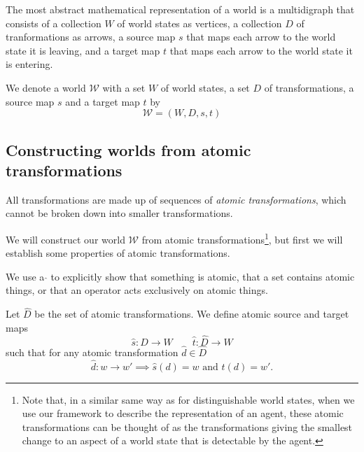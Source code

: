 \begin{postulate}
	The most abstract mathematical representation of a world is a multidigraph that consists of a collection $W$ of world states as vertices, a collection $D$ of tranformations as arrows, a source map $s$ that maps each arrow to the world state it is leaving, and a target map $t$ that maps each arrow to the world state it is entering.
\end{postulate}

\begin{definition}
	We denote a world $\mathscr{W}$ with a set $W$ of world states, a set $D$ of transformations, a source map $s$ and a target map $t$ by
	\begin{equation}
		\mathscr{W} = (W, D, s, t)
	\end{equation}
\end{definition}

\subsection{Constructing worlds from atomic transformations}

\begin{postulate}
	All transformations are made up of sequences of \emph{atomic transformations}, which cannot be broken down into smaller transformations.
\end{postulate}

We will construct our world $\mathscr{W}$ from atomic transformations\footnote{
Note that, in a similar same way as for distinguishable world states, when we use our framework to describe the representation of an agent, these atomic transformations can be thought of as the transformations giving the smallest change to an aspect of a world state that is detectable by the agent.
}, but first we will establish some properties of atomic transformations.

\begin{definition}
	We use a $\hat{ }$ to explicitly show that something is atomic, that a set contains atomic things, or that an operator acts exclusively on atomic things.
\end{definition}

Let $\hat{D}$ be the set of atomic transformations.
We define atomic source and target maps
\begin{equation}
	\hat{s}: \hat{D} \to W \quad\quad \hat{t}: \hat{D} \to W
\end{equation}
such that for any atomic transformation $\hat{d} \in \hat{D}$
\begin{equation}
	\hat{d}: w \to w' \implies \hat{s}(d) = w \text{ and } \hat{t}(d) = w'.
\end{equation}

